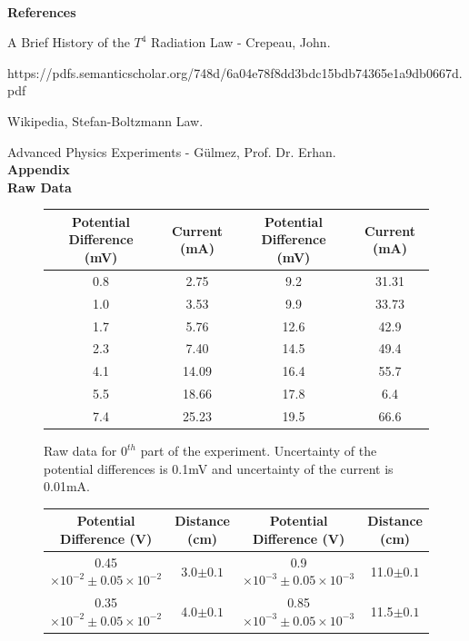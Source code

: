 \documentclass[11pt,a4paper]{article}
\begin{document}
{	    \\[\baselineskip] \textbf{References}\\[\baselineskip]
		\par[1]A Brief History of the $T^4$ Radiation Law - Crepeau, John. \par https://pdfs.semanticscholar.org/748d/6a04e78f8dd3bdc15bdb74365e1a9db0667d.pdf 
		\par[2]Wikipedia, Stefan-Boltzmann Law.
		\par[3]Advanced Physics Experiments - Gülmez, Prof. Dr. Erhan.
		\\[\baselineskip] \textbf{Appendix}\\[\baselineskip]
		\textbf{\small{Raw Data}}
		\begin{center}
		\begin{figure} [H] 
			\begin{tabular}{|c |c||c|c|} \hline
				Potential Difference (mV)& Current (mA) & Potential Difference (mV)& Current (mA)\\ [0.5ex] 
				\hline
				0.8 & 2.75 & 9.2 &31.31\\
				\hline
				1.0 & 3.53 &9.9 & 33.73\\
				\hline 
				1.7 & 5.76 & 12.6 & 42.9\\
				\hline 
				2.3 & 7.40 & 14.5 & 49.4\\
				\hline 
				4.1 & 14.09 & 16.4 & 55.7\\
				\hline 
				5.5 & 18.66 & 17.8 & 6.4\\
				\hline 
				7.4 & 25.23 & 19.5 & 66.6\\
				\hline
			\end{tabular}
		\caption{Raw data for $0^{th}$ part of the experiment. Uncertainty of the potential differences is 0.1mV and uncertainty of the current is 0.01mA.}
	\end{figure}
\end{center}
\begin{center}
	\begin{figure} [H] 
		\begin{tabular}{|c |c||c|c|} \hline
			Potential Difference (V)& Distance (cm) & Potential Difference (V)& Distance (cm)\\ [0.5ex] 
			\hline
			0.45$\times10^{-2} \pm 0.05\times10^{-2}$ & 3.0$\pm0.1$ & 0.9$\times10^{-3} \pm 0.05\times10^{-3}$ &11.0$\pm0.1$\\
			\hline
			0.35$\times10^{-2} \pm 0.05\times10^{-2}$ & 4.0$\pm0.1$&0.85$\times10^{-3} \pm 0.05\times10^{-3}$ & 11.5$\pm0.1$\\

\end{tabular}
\end{figure}
\end{center}}
\end{document}
